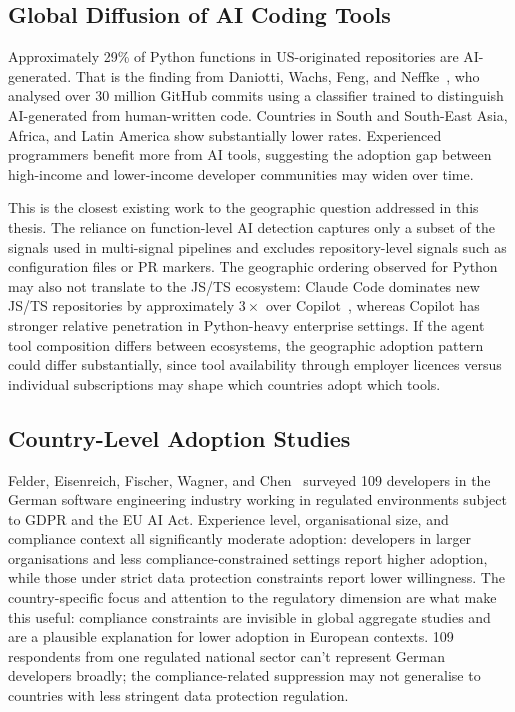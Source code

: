 \subsection{Global Diffusion of AI Coding Tools}

Approximately 29\% of Python functions in US-originated repositories are AI-generated. That is the finding from Daniotti, Wachs, Feng, and Neffke~\cite{daniotti2025}, who analysed over 30 million GitHub commits using a classifier trained to distinguish AI-generated from human-written code. Countries in South and South-East Asia, Africa, and Latin America show substantially lower rates. Experienced programmers benefit more from AI tools, suggesting the adoption gap between high-income and lower-income developer communities may widen over time.

This is the closest existing work to the geographic question addressed in this thesis. The reliance on function-level AI detection captures only a subset of the signals used in multi-signal pipelines and excludes repository-level signals such as configuration files or PR markers. The geographic ordering observed for Python may also not translate to the JS/TS ecosystem: Claude Code dominates new JS/TS repositories by approximately $3\times$ over Copilot~\cite{robbesAgenticVery2026}, whereas Copilot has stronger relative penetration in Python-heavy enterprise settings. If the agent tool composition differs between ecosystems, the geographic adoption pattern could differ substantially, since tool availability through employer licences versus individual subscriptions may shape which countries adopt which tools.

\subsection{Country-Level Adoption Studies}

Felder, Eisenreich, Fischer, Wagner, and Chen~\cite{felder2026} surveyed 109 developers in the German software engineering industry working in regulated environments subject to GDPR and the EU AI Act. Experience level, organisational size, and compliance context all significantly moderate adoption: developers in larger organisations and less compliance-constrained settings report higher adoption, while those under strict data protection constraints report lower willingness. The country-specific focus and attention to the regulatory dimension are what make this useful: compliance constraints are invisible in global aggregate studies and are a plausible explanation for lower adoption in European contexts. 109 respondents from one regulated national sector can't represent German developers broadly; the compliance-related suppression may not generalise to countries with less stringent data protection regulation.

